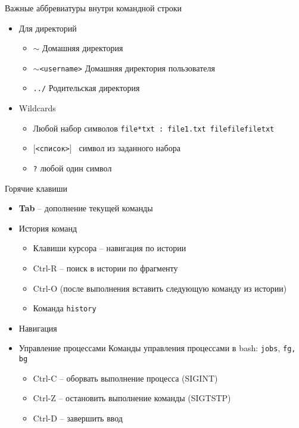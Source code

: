 \documentclass[ignorenonframetext, professionalfonts, hyperref={pdftex, unicode}]{beamer}
\begin{document}
\begin{frame}{Важные аббревиатуры внутри командной строки}
  \begin{itemize}
    \item Для директорий
    \begin{itemize}
      \item {\tt $\sim$} Домашняя директория
      \item {\tt $\sim$<username>} Домашняя директория пользователя
      \item {\tt ../} Родительская директория
    \end{itemize}
  \pause  
  \item Wildcards
    \begin{itemize}
      \item {\tt *} Любой набор символов {\tt file*txt : file1.txt filefilefiletxt}
      \item {\tt $[$<список>$]$ } символ из заданного набора {\tt }
      \item {\tt ?} любой один символ
     \end{itemize}

  \end{itemize}
\end{frame}       
\begin{frame}{Горячие клавиши}
  \begin{itemize}
    \item \textbf{Tab} -- дополнение текущей команды
     \pause
    \item История команд
      \begin{itemize}
        \item Клавиши курсора -- навигация по истории
        \item Ctrl-R -- поиск в истории по фрагменту
        \item Ctrl-O (после выполнения вставить следующую команду из истории)
        \item Команда {\tt history}
       \end{itemize}
    \item Навигация
	\item Управление процессами
		Команды управления процессами в bash: {\tt jobs}, {\tt fg, \tt bg}
	  \begin{itemize}
		\item Ctrl-C -- оборвать выполнение процесса (SIGINT)
		\item Ctrl-Z -- остановить выполнение команды (SIGTSTP)
		\item Ctrl-D -- завершить ввод
	  \end{itemize}
   \end{itemize}
\end{frame}
\end{document}
